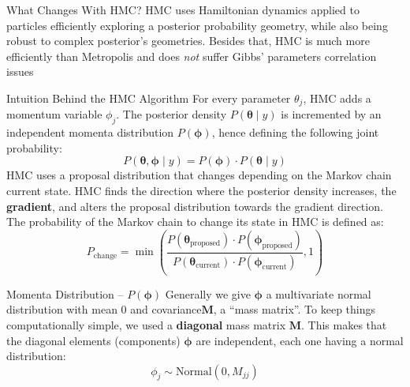 \begin{frame}{What Changes With HMC?}
	HMC uses Hamiltonian dynamics applied to particles efficiently exploring
	a posterior probability geometry,
	while also being robust to complex posterior's geometries.
	\vfill
	Besides that, HMC is much more efficiently than Metropolis and
	does \textit{not} suffer Gibbs' parameters correlation issues
\end{frame}

\begin{frame}{Intuition Behind the HMC Algorithm}
	\small
	For every parameter $\theta_j$, HMC adds a momentum variable $\phi_j$.
	The posterior density $P(\boldsymbol{\theta} \mid y)$ is incremented by an
	independent momenta distribution $P(\boldsymbol{\phi})$,
	hence defining the following joint probability:
	$$
		P(\boldsymbol{\theta}, \boldsymbol{\phi} \mid y) = P(\boldsymbol{\phi}) \cdot P(\boldsymbol{\theta} \mid y)
	$$
	\small
	HMC uses a proposal distribution that changes depending on the Markov chain current state.
	HMC finds the direction where the posterior density increases,
	the \textbf{gradient},
	and alters the proposal distribution towards the gradient direction.
	\vfill
	The probability of the Markov chain to change its state in HMC is defined as:
	$$
		P_{\text{change}} = \min\left({\frac{P(\boldsymbol{\theta}_{\text{proposed}}) \cdot P(\boldsymbol{\phi}_{\text{proposed}})}{P(\boldsymbol{\theta}_{\text{current}})\cdot P(\boldsymbol{\phi}_{\text{current}})}}, 1\right)
	$$
\end{frame}

\begin{frame}{Momenta Distribution -- $P(\boldsymbol{\phi})$}
	Generally we give $\boldsymbol{\phi}$ a multivariate normal distribution
	with mean $0$ and covariance$\mathbf{M}$,
	a ``mass matrix''.
	\vfill
	To keep things computationally simple,
	we used a \textbf{diagonal} mass matrix $\mathbf{M}$.
	This makes that the diagonal elements (components) $\boldsymbol{\phi}$ are independent,
	each one having a normal distribution:
	$$\phi_j \sim \text{Normal}(0, M_{jj})$$
\end{frame}

